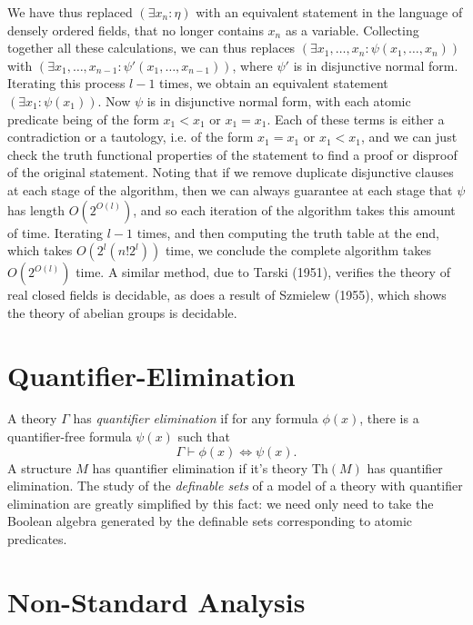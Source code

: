 \begin{example}
    We have thus replaced $(\exists x_n: \eta)$ with an equivalent statement in the language of densely ordered fields, that no longer contains $x_n$ as a variable. Collecting together all these calculations, we can thus replaces $(\exists x_1,\dots,x_n: \psi(x_1,\dots,x_n))$ with $(\exists x_1,\dots,x_{n-1}: \psi'(x_1,\dots,x_{n-1}))$, where $\psi'$ is in disjunctive normal form. Iterating this process $l-1$ times, we obtain an equivalent statement $(\exists x_1: \psi(x_1))$. Now $\psi$ is in disjunctive normal form, with each atomic predicate being of the form $x_1 < x_1$ or $x_1 = x_1$. Each of these terms is either a contradiction or a tautology, i.e. of the form $x_1 = x_1$ or $x_1 < x_1$, and we can just check the truth functional properties of the statement to find a proof or disproof of the original statement. Noting that if we remove duplicate disjunctive clauses at each stage of the algorithm, then we can always guarantee at each stage that $\psi$ has length $O(2^{O(l)})$, and so each iteration of the algorithm takes this amount of time. Iterating $l-1$ times, and then computing the truth table at the end, which takes $O(2^l (n! 2^l))$ time, we conclude the complete algorithm takes $O(2^{O(l)})$ time. A similar method, due to Tarski (1951), verifies the theory of real closed fields is decidable, as does a result of Szmielew (1955), which shows the theory of abelian groups is decidable.
\end{example}





\section{Quantifier-Elimination}

A theory $\Gamma$ has \emph{quantifier elimination} if for any formula $\phi(x)$, there is a quantifier-free formula $\psi(x)$ such that
%
\[ \Gamma \vdash \phi(x) \Leftrightarrow \psi(x). \]
%
A structure $M$ has quantifier elimination if it's theory $\text{Th}(M)$ has quantifier elimination. The study of the \emph{definable sets} of a model of a 
theory with quantifier elimination are greatly simplified by this fact: we need only need to take the Boolean algebra generated by the definable sets 
corresponding to atomic predicates.






\section{Non-Standard Analysis}

